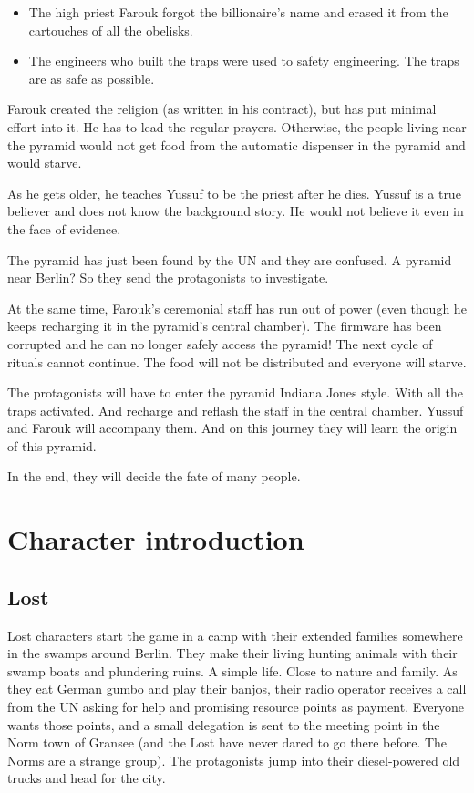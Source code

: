 \begin{itemize}
    \item The high priest Farouk forgot the billionaire's name and erased it from the cartouches of all the obelisks.
    \item The engineers who built the traps were used to safety engineering. The traps are as safe as possible.
\end{itemize}

Farouk created the religion (as written in his contract), but has put minimal effort into it. He has to lead the regular prayers. Otherwise, the people living near the pyramid would not get food from the automatic dispenser in the pyramid and would starve.

As he gets older, he teaches Yussuf to be the priest after he dies. Yussuf is a true believer and does not know the background story. He would not believe it even in the face of evidence.

The pyramid has just been found by the UN and they are confused. A pyramid near Berlin? So they send the protagonists to investigate.

At the same time, Farouk's ceremonial staff has run out of power (even though he keeps recharging it in the pyramid's central chamber). The firmware has been corrupted and he can no longer safely access the pyramid! The next cycle of rituals cannot continue. The food will not be distributed and everyone will starve.

The protagonists will have to enter the pyramid Indiana Jones style. With all the traps activated. And recharge and reflash the staff in the central chamber. Yussuf and Farouk will accompany them. And on this journey they will learn the origin of this pyramid.

In the end, they will decide the fate of many people.

\section{Character introduction}

\subsection{Lost}

Lost characters start the game in a camp with their extended families somewhere in the swamps around Berlin. They make their living hunting animals with their swamp boats and plundering ruins. A simple life. Close to nature and family. As they eat German gumbo and play their banjos, their radio operator receives a call from the UN asking for help and promising resource points as payment. Everyone wants those points, and a small delegation is sent to the meeting point in the Norm town of Gransee (and the Lost have never dared to go there before. The Norms are a strange group).
The protagonists jump into their diesel-powered old trucks and head for the city.

